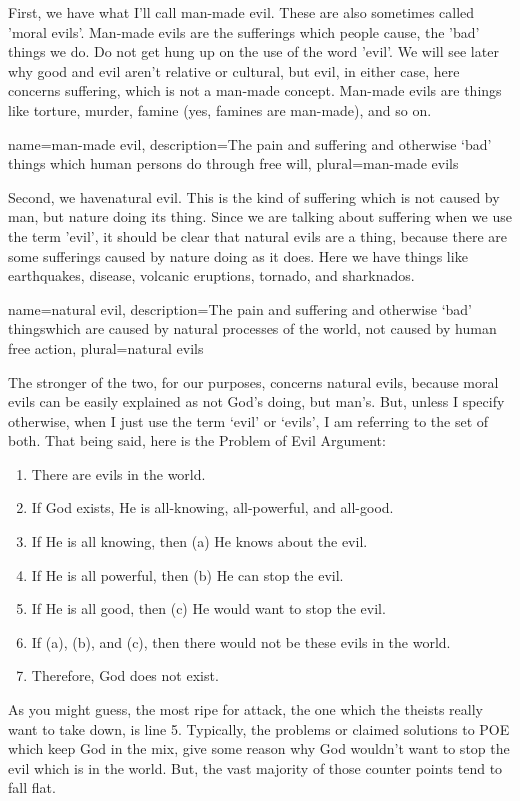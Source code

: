 First, we have what I'll call \gls{man-made evil}. These are also sometimes called 'moral evils'. Man-made evils are the sufferings which people cause, the 'bad' things we do. Do not get hung up on the use of the word 'evil'. We will see later why good and evil aren't relative or cultural, but evil, in either case, here concerns suffering, which is not a man-made concept. Man-made evils are things like torture, murder, famine (yes, famines are man-made), and so on. 

{
name=man-made evil,
description={The pain and suffering and otherwise `bad' things which human persons do through free will},
plural=man-made evils
}


Second, we have\gls{natural evil}. This is the kind of suffering which is not caused by man, but nature doing its thing. Since we are talking about suffering when we use the term 'evil', it should be clear that natural evils are a thing, because there are some sufferings caused by nature doing as it does. Here we have things like earthquakes, disease, volcanic eruptions, tornado, and sharknados. 

{
name=natural evil,
description={The pain and suffering and otherwise `bad' thingswhich are caused by natural processes of the world, not caused by human free action},
plural=natural evils
}


The stronger of the two, for our purposes, concerns natural evils, because moral evils can be easily explained as not God's doing, but man's. But, unless I specify otherwise, when I just use the term ‘evil’ or ‘evils’, I am referring to the set of both. That being said, here is the Problem of Evil Argument:
\begin{enumerate}
    \item There are evils in the world.
    \item If God exists, He is all-knowing, all-powerful, and all-good.
    \item If He is all knowing, then (a) He knows about the evil.
    \item If He is all powerful, then (b) He can stop the evil.
    \item If He is all good, then (c) He would want to stop the evil.
    \item If (a), (b), and (c), then there would not be these evils in the world.
    \item Therefore, God does not exist.
\end{enumerate}
As you might guess, the most ripe for attack, the one which the theists really want to take down, is line 5. Typically, the problems or claimed solutions to POE which keep God in the mix, give some reason why God wouldn't want to stop the evil which is in the world. But, the vast majority of those counter points tend to fall flat. 

